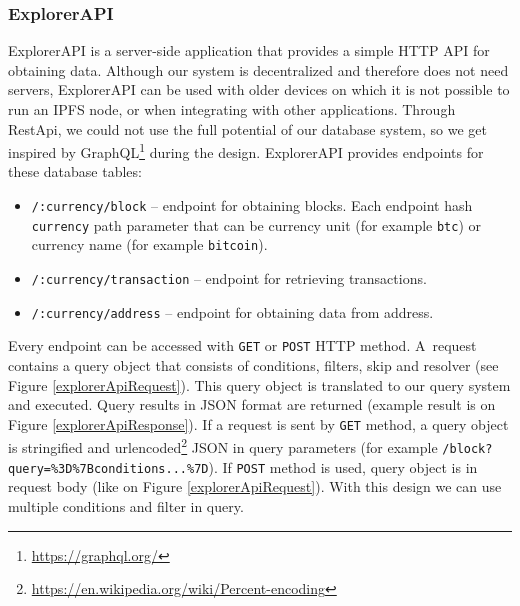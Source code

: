 \subsubsection{ExplorerAPI}
\label{explorerAPIroutes}
ExplorerAPI is a server-side application that provides a simple HTTP API for obtaining data. Although our system is decentralized and therefore does not need servers, ExplorerAPI can be used with older devices on which it is not possible to run an IPFS node, or when integrating with other applications. Through RestApi, we could not use the full potential of our database system, so we get inspired by GraphQL\footnote{\url{https://graphql.org/}} during the design. ExplorerAPI provides endpoints for these database tables:
\begin{itemize}
    \item \texttt{/:currency/block} -- endpoint for obtaining blocks. Each endpoint hash \texttt{currency} path parameter that can be currency unit (for example \texttt{btc}) or currency name (for example \texttt{bitcoin}).
    \item \texttt{/:currency/transaction} -- endpoint for retrieving transactions.  
    \item \texttt{/:currency/address} -- endpoint for obtaining data from address.
\end{itemize}
Every endpoint can be accessed with \texttt{GET} or \texttt{POST} HTTP method. A~request contains a query object that consists of conditions, filters, skip and resolver (see Figure \ref{explorerApiRequest}). This query object is translated to our query system and executed. Query results in JSON format are returned (example result is on Figure \ref{explorerApiResponse}). If a request is sent by \texttt{GET} method, a query object is stringified and urlencoded\footnote{\url{https://en.wikipedia.org/wiki/Percent-encoding}} JSON in query parameters (for example \texttt{/block?query=\%3D\%7Bconditions...\%7D}). If \texttt{POST} method is used, query object is in request body (like on Figure \ref{explorerApiRequest}). With this design we can use multiple conditions and filter in query. 





